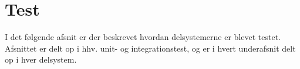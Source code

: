 \chapter{Test}
I det følgende afsnit er der beskrevet hvordan delsystemerne er blevet testet. Afsnittet er delt op i hhv. unit- og integrationstest, og er i hvert underafsnit delt op i hver delsystem.\\



